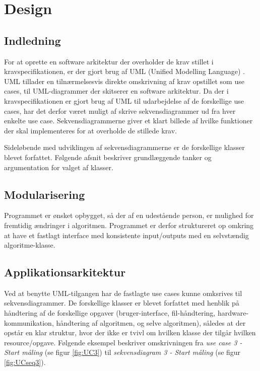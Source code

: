 \documentclass[rapport.tex]{subfiles}
\begin{document}
	\section{Design}
		\subsection{Indledning}
	For at oprette en software arkitektur der overholder de krav stillet i kravspecifikationen, er der gjort brug af UML (Unified Modelling Language) \cite{UML}. UML tillader en tilnærmelsesvis direkte omskrivning af krav opstillet som use cases, til UML-diagrammer der skitserer en software arkitektur. 
	Da der i kravspecifikationen er gjort brug af UML til udarbejdelse af de forskellige use cases, har det derfor været muligt af skrive sekvensdiagrammer ud fra hver enkelte use case. Sekvensdiagrammerne giver et klart billede af hvilke funktioner der skal implementeres for at overholde de stillede krav.  
	
	Sideløbende med udviklingen af sekvensdiagrammerne er de forskellige klasser blevet forfattet. Følgende afsnit beskriver grundlæggende tanker og argumentation for valget af klasser.

	
	\subsection{Modularisering}
	Programmet er ønsket opbygget, så der af en udestående person, er mulighed for fremtidig ændringer i algoritmen. Programmet er derfor struktureret op omkring at have et fastlagt interface med konsistente input/outputs med en selvstændig algoritme-klasse. 
	\subsection{Applikationsarkitektur}
	Ved at benytte UML-tilgangen har de fastlagte use cases kunne omksrives til sekvensdiagrammer. 
	De forskellige klasser er blevet forfattet med henblik på håndtering af de forskellige opgaver (bruger-interface, fil-håndtering, hardware-kommunikation, håndtering af algoritmen, og selve algoritmen), således at der opstår en klar struktur, hvor der ikke er tvivl om hvilken klasse der tilgår hvilken resource/opgave.
	Følgende eksempel beskriver omskrivningen fra \textit{use case 3 - Start måling} (se figur \ref{fig:UC3}) til \textit{sekvensdiagram 3 - Start måling} (se figur \ref{fig:UCseq3}).
\end{document}
